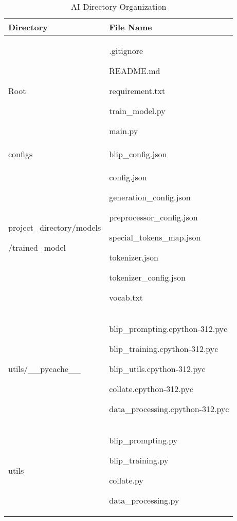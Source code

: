 \documentclass[conference]{IEEEtran}
\begin{document}
\begin{table}[h!]
\caption{AI Directory Organization}
\def\arraystretch{1.4} \small
    \begin{tabular}{|p{4.1cm}|p{4.1cm}|}
        \hline
        Directory & File Name \\ \hline
        Root & .gitignore \par README.md \par requirement.txt
        \par train\_model.py \par main.py\\ \hline
        configs & blip\_config.json \par \\ \hline
        project\_directory/models \par /trained\_model & config.json \par generation\_config.json \par preprocessor\_config.json \par special\_tokens\_map.json \par tokenizer.json \par tokenizer\_config.json \par vocab.txt \\ \hline
        utils/\_\_pycache\_\_ & blip\_prompting.cpython-312.pyc \par blip\_training.cpython-312.pyc \par blip\_utils.cpython-312.pyc \par collate.cpython-312.pyc \par data\_processing.cpython-312.pyc \\ \hline
        utils & blip\_prompting.py \par blip\_training.py \par collate.py \par data\_processing.py \\ \hline
    \end{tabular}
\end{table}
\end{document}
